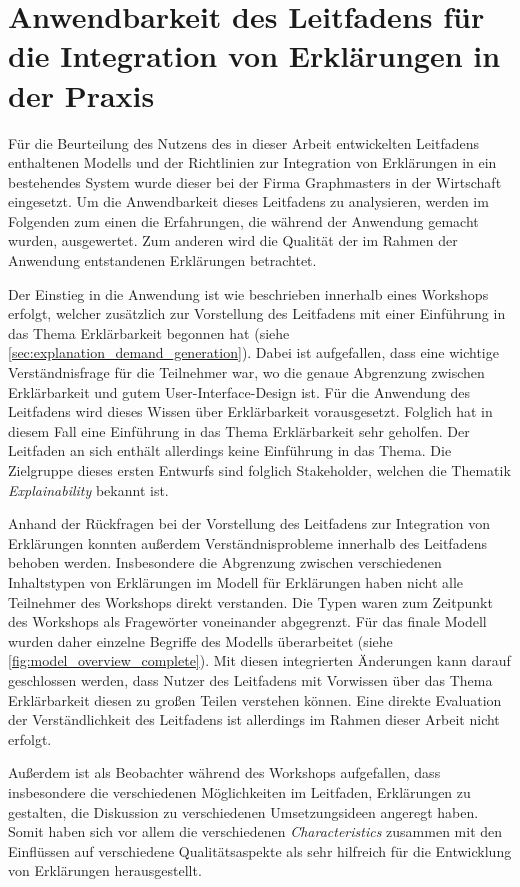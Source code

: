 \section{Anwendbarkeit des Leitfadens für die Integration von Erklärungen in der Praxis}

Für die Beurteilung des Nutzens des in dieser Arbeit entwickelten Leitfadens enthaltenen Modells und der Richtlinien zur Integration von Erklärungen in ein bestehendes System wurde dieser bei der Firma Graphmasters in der Wirtschaft eingesetzt. Um die Anwendbarkeit dieses Leitfadens zu analysieren, werden im Folgenden zum einen die Erfahrungen, die während der Anwendung gemacht wurden, ausgewertet. Zum anderen wird die Qualität der im Rahmen der Anwendung entstandenen Erklärungen betrachtet.

Der Einstieg in die Anwendung ist wie beschrieben innerhalb eines Workshops erfolgt, welcher zusätzlich zur Vorstellung des Leitfadens mit einer Einführung in das Thema Erklärbarkeit begonnen hat (siehe \autoref{sec:explanation_demand_generation}). Dabei ist aufgefallen, dass eine wichtige Verständnisfrage für die Teilnehmer war, wo die genaue Abgrenzung zwischen Erklärbarkeit und gutem User-Interface-Design ist. Für die Anwendung des Leitfadens wird dieses Wissen über Erklärbarkeit vorausgesetzt. Folglich hat in diesem Fall eine Einführung in das Thema Erklärbarkeit sehr geholfen. Der Leitfaden an sich enthält allerdings keine Einführung in das Thema. Die Zielgruppe dieses ersten Entwurfs sind folglich Stakeholder, welchen die Thematik \textit{Explainability} bekannt ist.

Anhand der Rückfragen bei der Vorstellung des Leitfadens zur Integration von Erklärungen konnten außerdem Verständnisprobleme innerhalb des Leitfadens behoben werden. Insbesondere die Abgrenzung zwischen verschiedenen Inhaltstypen von Erklärungen im Modell für Erklärungen haben nicht alle Teilnehmer des Workshops direkt verstanden. Die Typen waren zum Zeitpunkt des Workshops als Fragewörter voneinander abgegrenzt. Für das finale Modell wurden daher einzelne Begriffe des Modells überarbeitet (siehe \autoref{fig:model_overview_complete}). Mit diesen integrierten Änderungen kann darauf geschlossen werden, dass Nutzer des Leitfadens mit Vorwissen über das Thema Erklärbarkeit diesen zu großen Teilen verstehen können. Eine direkte Evaluation der Verständlichkeit des Leitfadens ist allerdings im Rahmen dieser Arbeit nicht erfolgt.

Außerdem ist als Beobachter während des Workshops aufgefallen, dass insbesondere die verschiedenen Möglichkeiten im Leitfaden, Erklärungen zu gestalten, die Diskussion zu verschiedenen Umsetzungsideen angeregt haben. Somit haben sich vor allem die verschiedenen \textit{Characteristics} zusammen mit den Einflüssen auf verschiedene Qualitätsaspekte als sehr hilfreich für die Entwicklung von Erklärungen herausgestellt.

